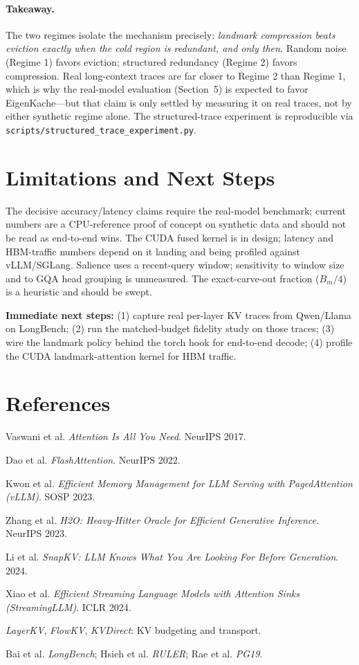 \documentclass[10pt,twocolumn]{article}
\newcommand{\code}[1]{\texttt{#1}}
\begin{document}
\paragraph{Takeaway.} The two regimes isolate the mechanism precisely:
\emph{landmark compression beats eviction exactly when the cold region is
redundant, and only then.} Random noise (Regime 1) favors eviction; structured
redundancy (Regime 2) favors compression. Real long-context traces are far
closer to Regime 2 than Regime 1, which is why the real-model evaluation
(Section~5) is expected to favor EigenKache---but that claim is only settled by
measuring it on real traces, not by either synthetic regime alone. The
structured-trace experiment is reproducible via
\code{scripts/structured\_trace\_experiment.py}.

\section{Limitations and Next Steps}
The decisive accuracy/latency claims require the real-model benchmark; current
numbers are a CPU-reference proof of concept on synthetic data and should not be
read as end-to-end wins. The CUDA fused kernel is in design; latency and
HBM-traffic numbers depend on it landing and being profiled against vLLM/SGLang.
Salience uses a recent-query window; sensitivity to window size and to GQA head
grouping is unmeasured. The exact-carve-out fraction ($B_m/4$) is a heuristic and
should be swept.

\textbf{Immediate next steps:} (1) capture real per-layer KV traces from
Qwen/Llama on LongBench; (2) run the matched-budget fidelity study on those
traces; (3) wire the landmark policy behind the torch hook for end-to-end
decode; (4) profile the CUDA landmark-attention kernel for HBM traffic.

\section*{References}
\small
\begin{enumerate}[label={[\arabic*]}]
\item Vaswani et al. \emph{Attention Is All You Need}. NeurIPS 2017.
\item Dao et al. \emph{FlashAttention}. NeurIPS 2022.
\item Kwon et al. \emph{Efficient Memory Management for LLM Serving with PagedAttention (vLLM)}. SOSP 2023.
\item Zhang et al. \emph{H2O: Heavy-Hitter Oracle for Efficient Generative Inference}. NeurIPS 2023.
\item Li et al. \emph{SnapKV: LLM Knows What You Are Looking For Before Generation}. 2024.
\item Xiao et al. \emph{Efficient Streaming Language Models with Attention Sinks (StreamingLLM)}. ICLR 2024.
\item \emph{LayerKV}, \emph{FlowKV}, \emph{KVDirect}: KV budgeting and transport.
\item Bai et al. \emph{LongBench}; Hsieh et al. \emph{RULER}; Rae et al. \emph{PG19}.
\end{enumerate}
\end{document}
